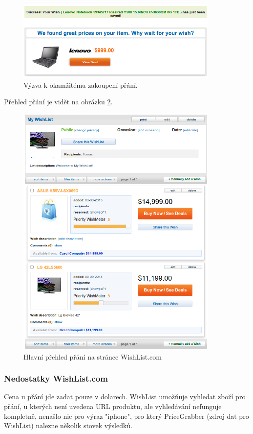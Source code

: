 \begin{figure}[htb]
\begin{center}
\includegraphics[width=100mm]{./pictures/wishlist-buynow.png}
\caption{Výzva k okamžitému zakoupení přání.}
\label{fig:wishlist-buynow}
\end{center}
\end{figure}

Přehled přání je vidět na obrázku \ref{fig:wishlist-wishlist}.

\begin{figure}[htb]
\begin{center}
\includegraphics[width=100mm]{./pictures/wishlist-wishlist.png}
\caption{Hlavní přehled přání na stránce WishList.com}
\label{fig:wishlist-wishlist}
\end{center}
\end{figure}

\subsubsection{Nedostatky WishList.com}
Cena u přání jde zadat pouze v dolarech. WishList umožňuje vyhledat zboží pro přání, u kterých není uvedena URL produktu, ale vyhledávání nefunguje kompletně, nenašlo nic pro výraz "iphone", pro který PriceGrabber (zdroj dat pro WishList) nalezne několik stovek výsledků.

